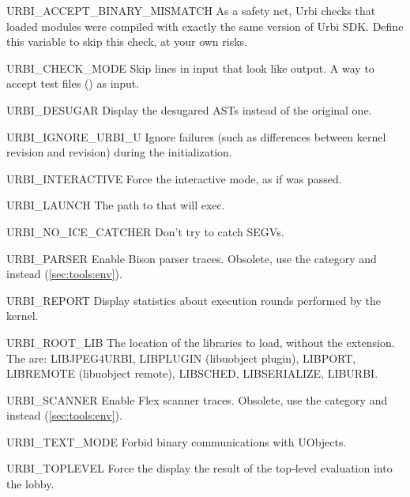 \begin{envs}
\item[URBI\_ACCEPT\_BINARY\_MISMATCH] As a safety net, Urbi checks that
  loaded modules were compiled with exactly the same version of Urbi SDK.
  Define this variable to skip this check, at your own risks.

\item[URBI\_CHECK\_MODE] Skip lines in input that look like \urbi output.  A
  way to accept test files () as input.

\item[URBI\_DESUGAR] Display the desugared ASTs instead of the
  original one.

\item[URBI\_IGNORE\_URBI\_U] Ignore failures (such as differences between
  kernel revision and  revision) during the initialization.

\item[URBI\_INTERACTIVE] Force the interactive mode, as if
   was passed.

\item[URBI\_LAUNCH] The path to  that
   will exec.

\item[URBI\_NO\_ICE\_CATCHER] Don't try to catch SEGVs.

\item[URBI\_PARSER] Enable Bison parser traces.  Obsolete, use the
   category and  instead
  (\autoref{sec:tools:env}).

\item[URBI\_REPORT] Display statistics about execution rounds performed by
  the kernel.

\item[URBI\_ROOT\_LIB\var{name}] The location of the libraries to load,
  without the extension.  The  are: LIBJPEG4URBI,
  LIBPLUGIN (libuobject plugin), LIBPORT, LIBREMOTE (libuobject remote),
  LIBSCHED, LIBSERIALIZE, LIBURBI.

\item[URBI\_SCANNER] Enable Flex scanner traces.  Obsolete, use the
   category and  instead
  (\autoref{sec:tools:env}).

\item[URBI\_TEXT\_MODE] Forbid binary communications with UObjects.

\item[URBI\_TOPLEVEL] Force the display the result of the top-level
  evaluation into the lobby.
\end{envs}

